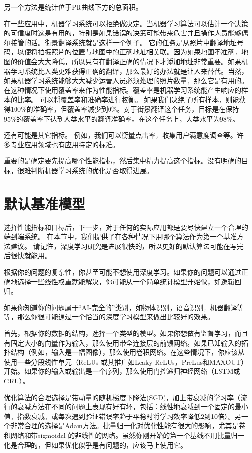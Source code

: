 另一个方法是统计位于PR曲线下方的总面积。

在一些应用中，机器学习系统可以拒绝做决定。当机器学习算法可以估计一个决策的可信度时这是有用的，特别是如果错误的决策可能带来危害并且操作人员能够偶尔接管的话。街景翻译系统就是这样一个例子。 它的任务是从照片中翻译地址号码，以便将拍摄照片的位置与地图中的正确地址相关联。因为如果地图不准确，地图的价值会大大降低，所以只有在翻译正确的情况下才添加地址非常重要。如果机器学习系统比人类更难获得正确的翻译，那么最好的办法就是让人来替代。当然，如果机器学习系统能够大大减少运营人员必须处理的照片数量，那么它是有用的。在这种情况下使用覆盖率来作为性能指标。覆盖率是机器学习系统能产生响应的样本的比率。 可以将覆盖率和准确率进行权衡。 如果我们决绝了所有样本，则能获得100\%的准确率，但覆盖率减少到0\%。对于街景翻译这个任务，目标是在保持95\%的覆盖率下达到人类水平的翻译准确率。在这个任务上，人类水平为98\%。

还有可能是其它指标。 例如，我们可以衡量点击率，收集用户满意度调查等。许多专业应用领域也有应用特定的标准。

重要的是确定要先提高哪个性能指标，然后集中精力提高这个指标。没有明确的目标，很难判断机器学习系统的优化是否取得进展。


\section{默认基准模型}

选择性能指标和目标后，下一步，对于任何的实际应用都是要尽快建立一个合理的端到端系统。 在本节中，我们提供了在各种情况下用哪个算法作为第一个基准方法建议。 请记住，深度学习研究是进展很快的，所以更好的默认算法可能在写完后很快就能用。

根据你的问题的复杂性，你甚至可能不想使用深度学习。如果你的问题可以通过正确地选择一些线性权重就能解决，你可能从一个简单统计模型开始做，如逻辑回归。

如果你知道你的问题属于“AI-完全的”类别，如物体识别，语音识别，机器翻译等等，那么你很可能通过一个恰当的深度学习模型来做出比较好的效果。

首先，根据你的数据的结构，选择一个类型的模型。如果你想做有监督学习，而且有固定大小的向量作为输入，那么使用带全连接层的前馈网络。如果已知输入的拓扑结构（例如，输入是一幅图像），那么使用卷积网络。在这些情况下，你应该从使用一些分段线性单元（ReLUs 或其推广如Leaky ReLUs，PreLus和MAXOUT）开始。如果你的输入或输出是一个序列，那么使用门控递归神经网络（LSTM或GRU）。

优化算法的合理选择是带动量的随机梯度下降法(SGD)，加上带衰减的学习率（流行的衰减方法在不同的问题上表现有好有坏，包括：线性地衰减到一个固定的最小值，指数衰减，或每次遇到验证错误率趋于平稳时将学习效率降低2到10倍）。另一个非常合理的选择是Adam方法。批量归一化对优化性能有很大的影响，尤其是卷积网络和带sigmoidal 的非线性的网络。虽然你刚开始的第一个基线不用批量归一化是合理的，但如果优化似乎是有问题的，应该马上使用它。

